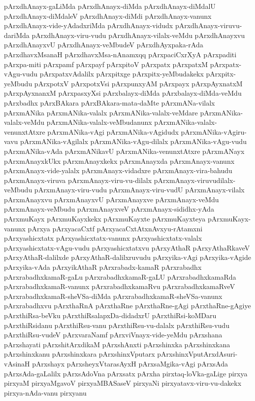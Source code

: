{pArxdhAnayx-gaLiMda
pArxdhAnayx-diMda
pArxdhAnayx-diMdalU
pArxdhAnayx-diMdaleV
pArxdhAnayx-diMdi
pArxdhAnayx-vanunx
pArxdhAnayx-vide-yAdadxriMda
pArxdhAnayx-vidudx
pArxdhAnayx-viruvu-dariMda
pArxdhAnayx-viru-vudu
pArxdhAnayx-vilalx-veMdu
pArxdhAnayxvu
pArxdhAnayxvU
pArxdhAnayx-veMbudeV
pArxdhAyxpaka-rAda
pArxdhavxMsanaH
pArxdhavxMsa-nAnamxqq
pArxpaciCxrXyA
pArxpaditi
pArxpa-miti
pArxpamf
pArxpayf
pArxpitoV
pArxpatx
pArxpatxM
pArxpatx-vAgu-vudu
pArxpatxvAdalilx
pArxpitxge
pArxpitx-yeMbudakekx
pArxpitx-yeMbudu
pArxpotxV
pArxpotxVsi
pArxpunxyAM
pArxpayx
pArxpAyxnatxM
pArxpAyxnanxM
pArxpasxyXsi
pArxbalayx-diMda
pArxbalayx-diMda-veMdu
pArxbadhx
pArxBAkara
pArxBAkara-mata-daMte
pArxmANa-vilalx
pArxmANika
pArxmANika-valalx
pArxmANika-valalx-veMdare
pArxmANika-valalx-veMdu
pArxmANika-valalx-veMbudanunx
pArxmANika-valalx-venunxtAtxre
pArxmANika-vAgi
pArxmANika-vAgidudx
pArxmANika-vAgiru-vavu
pArxmANika-vAgilalx
pArxmANika-vAgu-dilalx
pArxmANika-vAgu-vudu
pArxmANika-vAda
pArxmANikavU
pArxmANika-venunxtAtxre
pArxmANayx
pArxmAnayxkUkx
pArxmAnayxkekx
pArxmAnayxda
pArxmAnayx-vanunx
pArxmAnayx-vide-yalalx
pArxmAnayx-vidadxre
pArxmAnayx-vira-bahudu
pArxmAnayx-viruva
pArxmAnayx-viru-vu-dilalx
pArxmAnayx-viruvudilalx-veMbudu
pArxmAnayx-viru-vudu
pArxmAnayx-viru-vudU
pArxmAnayx-vilalx
pArxmAnayxvu
pArxmAnayxvU
pArxmAnayxve
pArxmAnayx-veMdu
pArxmAnayx-veMbudu
pArxmAnayxveV
pArxmAnayx-sididhx-yAda
pArxmuKayx
pArxmuKayxkekx
pArxmuKayxte
pArxmuKayxteya
pArxmuKayx-vanunx
pArxya
pArxyacaCxtf
pArxyacaCxtAtxnAvxyu-rAtamxni
pArxyashicxtatx
pArxyashicxtatx-vanunx
pArxyashicxtatx-valalx
pArxyashicxtatx-vAgu-vudu
pArxyashicxtatxvu
pArxyAthaR
pArxyAthaRkaveV
pArxyAthaR-dalilxde
pArxyAthaR-dalilxruvudu
pArxyika-vAgi
pArxyika-vAgide
pArxyika-vAda
pArxyikAthaR
pArxrabadx-kamaR
pArxrabadhx
pArxrabadhxkamaR-gaLu
pArxrabadhxkamaR-gaLU
pArxrabadhxkamaRda
pArxrabadhxkamaR-vanunx
pArxrabadhxkamaRvu
pArxrabadhxkamaRveV
pArxrabadhxkamaR-sheVSa-diMda
pArxrabadhxkamaR-sheVSa-vanunx
pArxrabadhxvu
pArxthaRnA
pArxthaRne
pArxthaRne-gAgi
pArxthaRne-gAgiye
pArxthiRsa-beVku
pArxthiRsalapxDa-didadxrU
pArxthiRsi-koMDaru
pArxthiRsidanu
pArxthiRsu-vanu
pArxthiRsu-vu-dalalx
pArxthiRsu-vudu
pArxthiRsu-vudeV
pArxvaraNamf
pArxviVnayx-vide-yeMdu
pArxshana
pArxshayati
pArxshitArxdikaM
pArxshAnxti
pArxshinxka
pArxshinxkana
pArxshinxkanu
pArxshinxkara
pArxshinxVputarx
pArxshinxVputArxdAsuri-vAsinaH
pArxshayx
pArxsheyxVtarasAyxH
pArxsaMgika-vAgi
pArxsAda
pArxsAda-gaLalilx
pArxsAdoVna
pArxsatx
pArxha
pirxtaq-loVka-gaLige
pirxya
pirxyaM
pirxyaMgavoV
pirxyaMBASaseV
pirxyaNi
pirxyatavx-viru-vu-dakekx
pirxya-nAda-vanu
pirxyanu
}
